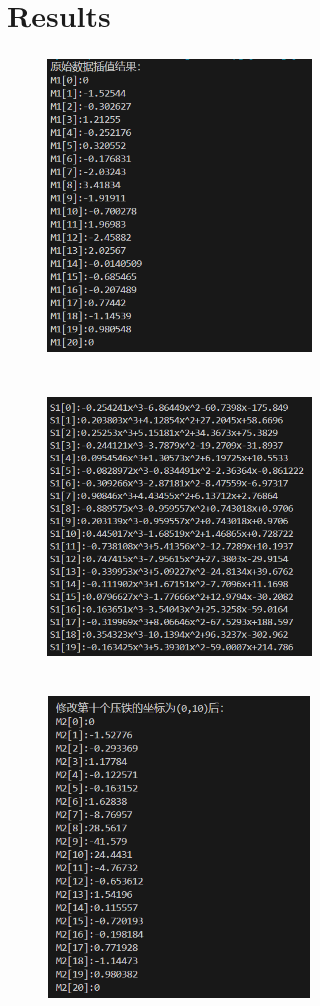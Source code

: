 \documentclass{ctexart}
\begin{document}
	\section{Results}
		
	\begin{figure}[H]
		\centering 
		\includegraphics[height=8cm,width=7cm]{1.png}
		\end{figure}
		\begin{figure}[H]
			\centering 
			\includegraphics[height=8cm,width=7cm]{2.png}
			\end{figure}
			\begin{figure}[H]
				\centering 
				\includegraphics[height=8cm,width=7cm]{3.png}
				\end{figure}
\end{document}
